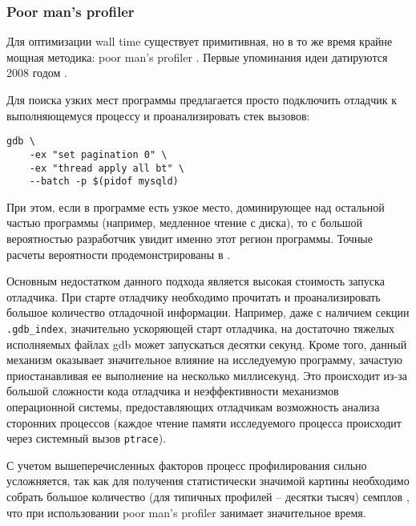 \subsubsection{Poor man's profiler}
Для оптимизации wall time существует примитивная, но в то же время крайне мощная методика: poor man's profiler \cite{pmp:site}.
Первые упоминания идеи датируются 2008 годом \cite{pmp:so, pmp:mysqld, pmp:contention}.

Для поиска узких мест программы предлагается просто подключить отладчик к выполняющемуся процессу и проанализировать стек вызовов:
\begin{verbatim}
gdb \
    -ex "set pagination 0" \
    -ex "thread apply all bt" \
    --batch -p $(pidof mysqld)
\end{verbatim}

При этом, если в программе есть узкое место, доминирующее над остальной частью программы (например, медленное чтение с диска), то
с большой вероятностью разработчик увидит именно этот регион программы.
Точные расчеты вероятности продемонстрированы в \cite{pmp:so}.

Основным недостатком данного подхода является высокая стоимость запуска отладчика.
При старте отладчику необходимо прочитать и проанализировать большое количество отладочной информации.
Например, даже с наличием секции \verb!.gdb_index!, значительно ускоряющей старт отладчика, на достаточно тяжелых исполняемых файлах
gdb может запускаться десятки секунд.
Кроме того, данный механизм оказывает значительное влияние на исследуемую программу, зачастую приостанавливая ее выполнение
на несколько миллисекунд. Это происходит из-за большой сложности кода отладчика и неэффективности механизмов операционной системы,
предоставляющих отладчикам возможность анализа сторонних процессов (каждое чтение памяти исследуемого процесса
происходит через системный вызов \verb!ptrace!).

С учетом вышеперечисленных факторов процесс профилирования сильно усложняется, так как для получения
статистически значимой картины необходимо собрать большое количество (для типичных профилей – десятки тысяч) семплов \cite{pmp:so, gprof:accuracy}, что при использовании poor man's profiler занимает значительное время.

